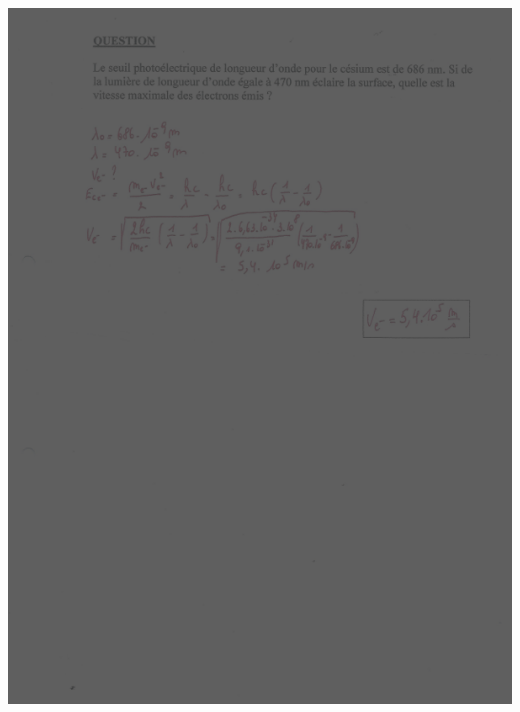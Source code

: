 {{{\includegraphics[width=17.498cm,height=24.13cm]{Pictures/10000001000002570000033B5842099DBC063D07.png}

}}}
